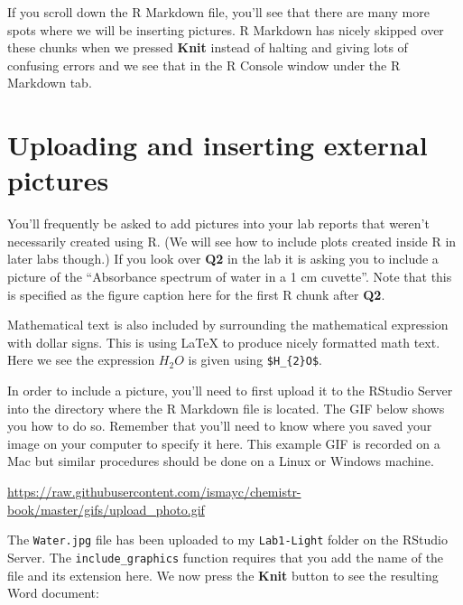 \documentclass[]{tufte-book}
\begin{document}
If you scroll down the R Markdown file, you'll see that there are many
more spots where we will be inserting pictures. R Markdown has nicely
skipped over these chunks when we pressed \textbf{Knit} instead of
halting and giving lots of confusing errors and we see that in the R
Console window under the R Markdown tab.

\section{Uploading and inserting external
pictures}\label{uploading-and-inserting-external-pictures}

You'll frequently be asked to add pictures into your lab reports that
weren't necessarily created using R. (We will see how to include plots
created inside R in later labs though.) If you look over \textbf{Q2} in
the lab it is asking you to include a picture of the ``Absorbance
spectrum of water in a 1 cm cuvette''. Note that this is specified as
the figure caption here for the first R chunk after \textbf{Q2}.

Mathematical text is also included by surrounding the mathematical
expression with dollar signs. This is using LaTeX to produce nicely
formatted math text. Here we see the expression \(H_{2}O\) is given
using \texttt{\$H\_\{2\}O\$}.

In order to include a picture, you'll need to first upload it to the
RStudio Server into the directory where the R Markdown file is located.
The GIF below shows you how to do so. Remember that you'll need to know
where you saved your image on your computer to specify it here. This
example GIF is recorded on a Mac but similar procedures should be done
on a Linux or Windows machine.

\vspace{0.1in}

\begin{center}\footnotesize{\url{https://raw.githubusercontent.com/ismayc/chemistr-book/master/gifs/upload_photo.gif}}\end{center}

\vspace{0.1in}

The \texttt{Water.jpg} file has been uploaded to my \texttt{Lab1-Light}
folder on the RStudio Server. The \texttt{include\_graphics} function
requires that you add the name of the file and its extension here. We
now press the \textbf{Knit} button to see the resulting Word document:

\vspace{0.1in}
\end{document}
